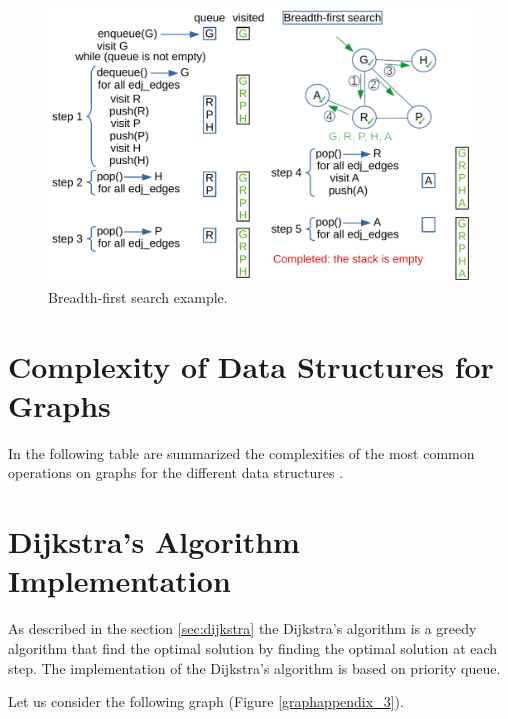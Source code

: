 \begin{figure}[H]
	\begin{center}
		\includegraphics[scale=.6]{chapters/appendix/images/appendixgraphs/graphsappendix_2.pdf}
		\caption[Breadth-first search example.]{Breadth-first search example.}
		\label{graphappendix_2}
	\end{center}
\end{figure}

\chapter{Complexity of Data Structures for Graphs}
\label{graphsappendix}
In the following table are summarized the complexities of the most common operations on graphs for the different data structures \cite{goodrich2013data}.

\chapter{Dijkstra's Algorithm Implementation}
\label{dijkstraimplementation}
As described in the section \ref{sec:dijkstra} the Dijkstra's algorithm is a greedy algorithm that find the optimal solution by finding the optimal solution at each step. The implementation of the Dijkstra's algorithm is based on priority queue.

Let us consider the following graph (Figure \ref{graphappendix_3}).

